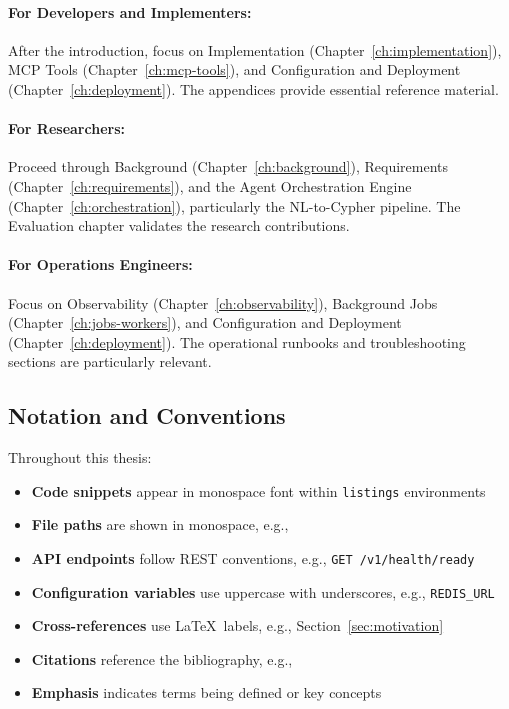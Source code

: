 \documentclass[a4paper,twoside]{sapthesis}
\begin{document}
\paragraph{For Developers and Implementers:}
After the introduction, focus on Implementation (Chapter~\ref{ch:implementation}), MCP Tools (Chapter~\ref{ch:mcp-tools}), and Configuration and Deployment (Chapter~\ref{ch:deployment}). The appendices provide essential reference material.

\paragraph{For Researchers:}
Proceed through Background (Chapter~\ref{ch:background}), Requirements (Chapter~\ref{ch:requirements}), and the Agent Orchestration Engine (Chapter~\ref{ch:orchestration}), particularly the NL-to-Cypher pipeline. The Evaluation chapter validates the research contributions.

\paragraph{For Operations Engineers:}
Focus on Observability (Chapter~\ref{ch:observability}), Background Jobs (Chapter~\ref{ch:jobs-workers}), and Configuration and Deployment (Chapter~\ref{ch:deployment}). The operational runbooks and troubleshooting sections are particularly relevant.

\subsection{Notation and Conventions}

Throughout this thesis:

\begin{itemize}
    \item \textbf{Code snippets} appear in monospace font within \lstinline{listings} environments
    \item \textbf{File paths} are shown in monospace, e.g., 
    \item \textbf{API endpoints} follow REST conventions, e.g., \texttt{GET /v1/health/ready}
    \item \textbf{Configuration variables} use uppercase with underscores, e.g., \texttt{REDIS\_URL}
    \item \textbf{Cross-references} use \LaTeX\ labels, e.g., Section~\ref{sec:motivation}
    \item \textbf{Citations} reference the bibliography, e.g., \cite{openai2023gpt4}
    \item \textbf{Emphasis} indicates terms being defined or key concepts
\end{itemize}
\end{document}

